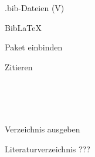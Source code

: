 \begin{frame}{.bib-Dateien (V)}
  \bibexamplev
\end{frame}

\begin{frame}[fragile]{Bib\LaTeX\hfill{}}
  \begin{block}{Paket einbinden}
    \begin{lstverbatim}
    \usepackage[backend=biber]{biblatex} %
    
    \end{lstverbatim}
  \end{block}
  \begin{block}{Zitieren}
      \begin{minipage}{0.6\linewidth}
        \begin{lstverbatim}
        \cite{numpy}
        \cite[20]{numpy}
        \cite[1-3]{numpy}
        \cite{splot,root}
        \end{lstverbatim}
      \end{minipage}
      \begin{minipage}{0.35\linewidth}
        \cite{numpy}\\
        \cite[20]{numpy}\\
        \cite[1-3]{numpy}\\
        \cite{splot,root}
      \end{minipage}
  \end{block}
  \begin{block}{Verzeichnis ausgeben}
    \begin{lstverbatim}
    \nocite{anleitung01} %
    \nocite{*}           %
    \printbibliography
    \end{lstverbatim}
  \end{block}
\end{frame}

\begin{frame}{Literaturverzeichnis}
  \centering
  \pause
  \Huge ???
\end{frame}

